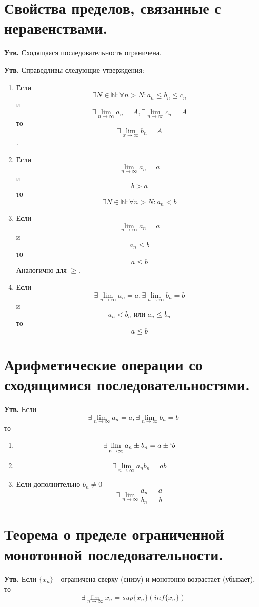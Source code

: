\documentclass[a4paper,12pt]{article}
\begin{document}
\begin{flushleft}
	\section{Свойства пределов, связанные с неравенствами.}

	\textbf{Утв.} Сходящаяся последовательность ограничена.

	\textbf{Утв.} Справедливы следующие утверждения:
	\begin{enumerate}
	\item Если $$\exists N \in \mathbb{N}: \forall n > N: a_n \leq b_n \leq c_n$$ и $$\exists \lim_{n \to \infty} a_n = A, \exists \lim_{n \to \infty} c_n = A$$ то $$\exists \lim_{x \to \infty} b_n = A$$.
	\item Если $$\lim_{n \to \infty} a_n = a$$ и $$b > a$$ то $$\exists N \in \mathbb{N}: \forall n > N: a_n < b$$
	\item Если $$\lim_{n \to \infty} a_n = a$$ и $$a_n \leq b$$ то $$a \leq b$$ Аналогично для $\geq$.
	\item Если $$\exists \lim_{n \to \infty} a_n = a, \exists \lim_{n \to \infty} b_n = b$$ и $$a_n < b_n \text{ или } a_n \leq b_n$$ то $$a \leq b$$ 
	\end{enumerate}
	
	\section{Арифметические операции со сходящимися последовательностями.}

	\textbf{Утв.} Если $$\exists \lim_{n \to \infty} a_n = a, \exists \lim_{n \to \infty} b_n = b$$ то 
	\begin{enumerate}
	\item $$\exists \lim_{n \to \infty} a_n \pm b_n = a \pm` b$$
	\item $$\exists \lim_{n \to \infty} a_n b_n = a b$$
	\item Если дополнительно $b_n \neq 0$ $$\exists \lim_{n \to \infty} \dfrac{a_n}{b_n} = \dfrac{a}{b}$$
	\end{enumerate}
	
	\section{Теорема о пределе ограниченной монотонной последовательности.}

	\textbf{Утв.} Если $\{x_n\}$ - ограничена сверху (снизу) и монотонно возрастает (убывает), то $$\exists \lim_{n \to \infty} x_n = sup\{x_n\} (inf\{x_n\})$$


\end{flushleft}
\end{document}
